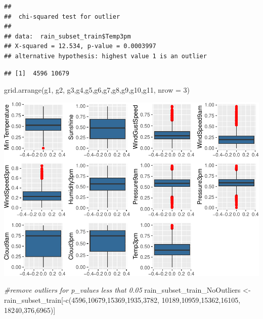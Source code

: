 \documentclass[
]{article}
\newenvironment{Shaded}{\begin{snugshade}}{\end{snugshade}}
\newcommand{\AttributeTok}[1]{\textcolor[rgb]{0.77,0.63,0.00}{#1}}
\newcommand{\CommentTok}[1]{\textcolor[rgb]{0.56,0.35,0.01}{\textit{#1}}}
\newcommand{\DecValTok}[1]{\textcolor[rgb]{0.00,0.00,0.81}{#1}}
\newcommand{\FunctionTok}[1]{\textcolor[rgb]{0.00,0.00,0.00}{#1}}
\newcommand{\NormalTok}[1]{#1}
\newcommand{\OtherTok}[1]{\textcolor[rgb]{0.56,0.35,0.01}{#1}}
\newcommand{\SpecialCharTok}[1]{\textcolor[rgb]{0.00,0.00,0.00}{#1}}
\begin{document}
\begin{verbatim}
## 
##  chi-squared test for outlier
## 
## data:  rain_subset_train$Temp3pm
## X-squared = 12.534, p-value = 0.0003997
## alternative hypothesis: highest value 1 is an outlier
\end{verbatim}

\begin{Shaded}
\end{Shaded}

\begin{verbatim}
## [1]  4596 10679
\end{verbatim}

\begin{Shaded}
\begin{Highlighting}[]
\FunctionTok{grid.arrange}\NormalTok{(g1, g2, g3,g4,g5,g6,g7,g8,g9,g10,g11,  }\AttributeTok{nrow =} \DecValTok{3}\NormalTok{)}
\end{Highlighting}
\end{Shaded}

\includegraphics{Rain_Australia_files/figure-latex/Remove outliers-1.pdf}

\begin{Shaded}
\begin{Highlighting}[]
\CommentTok{\#remove outliers for p\_values less that 0.05}
\NormalTok{rain\_subset\_train\_NoOutliers }\OtherTok{\textless{}{-}}\NormalTok{ rain\_subset\_train[}\SpecialCharTok{{-}}\FunctionTok{c}\NormalTok{(}\DecValTok{4596}\NormalTok{,}\DecValTok{10679}\NormalTok{,}\DecValTok{15369}\NormalTok{,}\DecValTok{1935}\NormalTok{,}\DecValTok{3782}\NormalTok{,}
                                                     \DecValTok{10189}\NormalTok{,}\DecValTok{10959}\NormalTok{,}\DecValTok{15362}\NormalTok{,}\DecValTok{16105}\NormalTok{,}
                                                     \DecValTok{18240}\NormalTok{,}\DecValTok{376}\NormalTok{,}\DecValTok{6965}\NormalTok{)]}
\end{Highlighting}
\end{Shaded}
\end{document}

